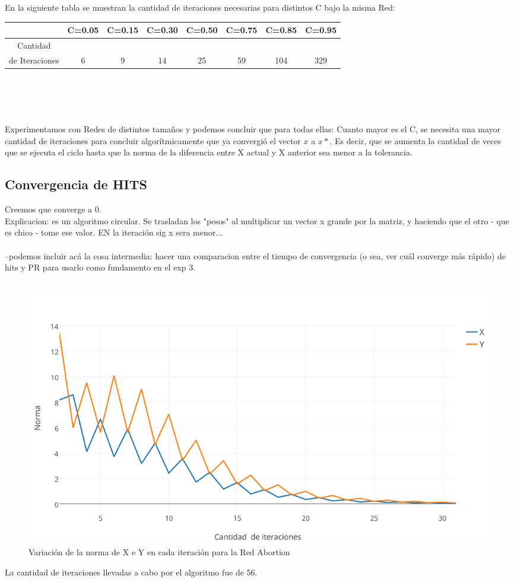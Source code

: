 \documentclass[a4paper]{article}
\begin{document}
En la siguiente tabla se muestran la cantidad de iteraciones necesarias para distintos C bajo la misma Red: \\
 \begin{tabular}[c]{|c|c|c|c|c|c|c|c|}
\hline
 & C=0.05 & C=0.15 & C=0.30 & C=0.50 & C=0.75 & C=0.85 & C=0.95 \\
\hline
Cantidad &  & & & & & & \\ 
de Iteraciones & 6 & 9 & 14 & 25 & 59 & 104 & 329\\
\hline
	\end{tabular}\\\\
\\
\\
\indent Experimentamos con Redes de distintos tama\~nos y podemos concluir que para todas ellas: Cuanto mayor es el C, se necesita una mayor cantidad de iteraciones para concluir algor\'itmicamente que ya convergi\'o el vector $x$ a $x\ast$. Es decir, que se aumenta la cantidad de veces que se ejecuta el ciclo hasta que la norma de la diferencia entre X actual y X anterior sea menor a la tolerancia. 
\newpage

\subsection{Convergencia de HITS}
Creemos que converge a 0. \\

Explicacion: es un algoritmo circular. Se trasladan los "pesos" al multiplicar un vector x grande por la matriz, y haciendo que el otro - que es chico - tome ese valor. EN la iteración sig x sera menor...\\ 
\\
--podemos incluir acá la cosa intermedia: hacer una comparacion entre el tiempo de convergencia (o sea, ver cuál converge más rápido) de hits y PR para usarlo como fundamento en el exp 3.\\
\\


\begin{figure}[h!]
  \begin{center}
	\includegraphics[scale=0.50]{imagenes/exp12/abortionHITS.png}
	\caption{Variaci\'on de la norma de X e Y en cada iteraci\'on para la Red Abortion}
	\label{nombreparareferenciar}
  \end{center}
\end{figure}
La cantidad de iteraciones llevadas a cabo por el algoritmo fue de 56.\\
\end{document}
